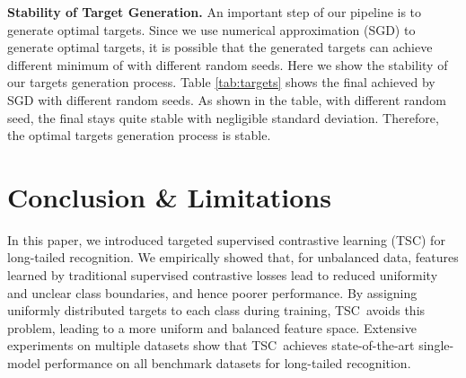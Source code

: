 \documentclass[10pt,twocolumn,letterpaper]{article}
\newcommand{\name} {TSC}
\begin{document}
\begin{table}[h]
\caption{ achieved with different random seeds during optimal targets generation for different numbers of classes.}
\vspace{-5mm}
\label{tab:targets}
\begin{center}
\end{center}
\vspace{-10pt}
\end{table}

\textbf{Stability of Target Generation.} An important step of our pipeline is to generate optimal targets. Since we use numerical approximation (SGD) to generate optimal targets, it is possible that the generated targets can achieve different minimum of  with different random seeds. Here we show the stability of our targets generation process. Table \ref{tab:targets} shows the final  achieved by SGD with different random seeds. As shown in the table, with different random seed, the final  stays quite stable with negligible standard deviation. Therefore, the optimal targets generation process is stable.
 \section{Conclusion \& Limitations}
In this paper, we introduced targeted supervised contrastive learning (\name) for long-tailed recognition. We empirically showed that, for unbalanced data, features learned by traditional supervised contrastive losses lead to reduced uniformity and unclear class boundaries, and hence poorer performance. By assigning uniformly distributed targets to each class during training, \name~avoids this problem, leading to a more uniform and balanced feature space. Extensive experiments on multiple datasets show that \name\ achieves state-of-the-art single-model performance on all benchmark datasets for long-tailed recognition.
\end{document}
